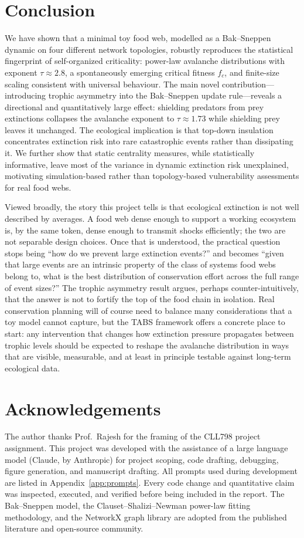 \documentclass[11pt,a4paper]{article}
\begin{document}
\section{Conclusion}\label{sec:conclusion}
We have shown that a minimal toy food web, modelled as a Bak--Sneppen dynamic on four different network topologies, robustly reproduces the statistical fingerprint of self-organized criticality: power-law avalanche distributions with exponent $\tau \approx 2.8$, a spontaneously emerging critical fitness $f_c$, and finite-size scaling consistent with universal behaviour. The main novel contribution---introducing trophic asymmetry into the Bak--Sneppen update rule---reveals a directional and quantitatively large effect: shielding predators from prey extinctions collapses the avalanche exponent to $\tau \approx 1.73$ while shielding prey leaves it unchanged. The ecological implication is that top-down insulation concentrates extinction risk into rare catastrophic events rather than dissipating it. We further show that static centrality measures, while statistically informative, leave most of the variance in dynamic extinction risk unexplained, motivating simulation-based rather than topology-based vulnerability assessments for real food webs.

Viewed broadly, the story this project tells is that ecological extinction is not well described by averages. A food web dense enough to support a working ecosystem is, by the same token, dense enough to transmit shocks efficiently; the two are not separable design choices. Once that is understood, the practical question stops being ``how do we prevent large extinction events?'' and becomes ``given that large events are an intrinsic property of the class of systems food webs belong to, what is the best distribution of conservation effort across the full range of event sizes?'' The trophic asymmetry result argues, perhaps counter-intuitively, that the answer is not to fortify the top of the food chain in isolation. Real conservation planning will of course need to balance many considerations that a toy model cannot capture, but the TABS framework offers a concrete place to start: any intervention that changes how extinction pressure propagates between trophic levels should be expected to reshape the avalanche distribution in ways that are visible, measurable, and at least in principle testable against long-term ecological data.

\section*{Acknowledgements}
The author thanks Prof.\ Rajesh for the framing of the CLL798 project assignment. This project was developed with the assistance of a large language model (Claude, by Anthropic) for project scoping, code drafting, debugging, figure generation, and manuscript drafting. All prompts used during development are listed in Appendix~\ref{app:prompts}. Every code change and quantitative claim was inspected, executed, and verified before being included in the report. The Bak--Sneppen model, the Clauset--Shalizi--Newman power-law fitting methodology, and the NetworkX graph library are adopted from the published literature and open-source community.
\end{document}
